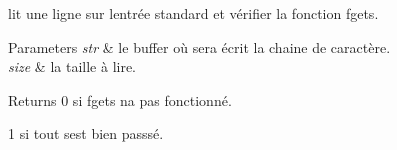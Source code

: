 lit une ligne sur l\textquotesingle{}entrée standard et vérifier la fonction fgets. 


\begin{DoxyParams}{Parameters}
{\em str} & le buffer où sera écrit la chaine de caractère. \\
\hline
{\em size} & la taille à lire. \\
\hline
\end{DoxyParams}
\begin{DoxyReturn}{Returns}
0 si fgets n\textquotesingle{}a pas fonctionné. 

1 si tout s\textquotesingle{}est bien passsé. 
\end{DoxyReturn}
